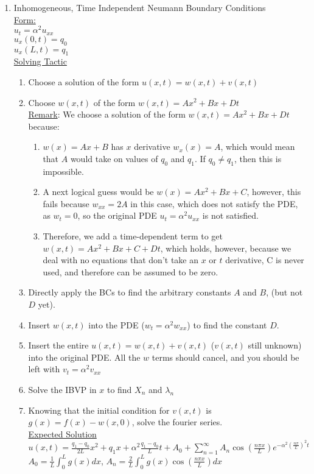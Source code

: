 \documentclass{article}
\begin{document}
\begin{enumerate}
    \item Inhomogeneous, Time Independent Neumann Boundary Conditions
    \medskip\\
    \underline{Form:}
    \medskip\\
    $u_t = \alpha^2 u_{xx}$
    \smallskip\\
    $u_x(0,t) = q_0$\\
    $u_x(L,t) = q_1$
    \medskip\\
    \underline{Solving Tactic}
    \begin{enumerate}
        \item Choose a solution of the form $u(x,t) = w(x,t) + v(x,t)$
        \item Choose $w(x,t)$ of the form $w(x,t) = Ax^2 + Bx + Dt$
        \medskip\\
        \underline{Remark}: We choose a solution of the form $w(x,t) = Ax^2 + Bx + Dt$ because:
        \begin{enumerate}
            \item $w(x) = Ax + B$ has $x$ derivative $w_x(x) = A$, which would mean that $A$ would take on values of $q_0$ and $q_1$. If $q_0 \neq q_1$, then this is impossible.
            \item A next logical guess would be $w(x) = Ax^2 + Bx + C$, however, this fails because $w_{xx} = 2A$ in this case, which does not satisfy the PDE, as $w_t = 0$, so the original PDE $u_t = \alpha^2 u_{xx}$ is not satisfied.
            \item Therefore, we add a time-dependent term to get $w(x,t) = Ax^2 + Bx + C + Dt$, which holds, however, because we deal with no equations that don't take an $x$ or $t$ derivative, C is never used, and therefore can be assumed to be zero.
        \end{enumerate}
        \item Directly apply the BCs to find the arbitrary constants $A$ and $B$, (but not $D$ yet).
        \item Insert $w(x,t)$ into the PDE ($w_t = \alpha^2 w_{xx}$) to find the constant $D$.
        \item Insert the entire $u(x,t) = w(x,t) + v(x,t)$ ($v(x,t)$ still unknown) into the original PDE. All the $w$ terms should cancel, and you should be left with $v_t = \alpha^2 v_{xx}$
        \item Solve the IBVP in $x$ to find $X_n$ and $\lambda_n$
        \item Knowing that the initial condition for $v(x,t)$ is $g(x) = f(x) - w(x,0)$, solve the fourier series.
        \medskip\\
        \underline{Expected Solution}
        \medskip\\
        $u(x,t) = \frac{q_1 - q_0}{2L}x^2 + q_1x + \alpha^2\frac{q_1 - q_0}{L}t + A_0 + \sum_{n=1}^\infty A_n\cos\left(\frac{n\pi x}{L}\right)e^{-\alpha^2 \left(\frac{n\pi}{L}\right)^2 t}$
        \medskip\\
        $A_0 = \frac{1}{L} \int_0^L g(x)dx$, $A_n = \frac{2}{L}\int_0^L g(x) \cos\left(\frac{n\pi x}{L}\right)dx$
    \end{enumerate}
    

\end{enumerate}
\end{document}
